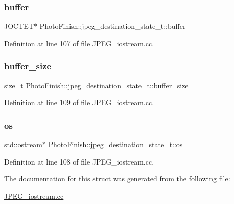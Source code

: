 \subsubsection{\texorpdfstring{buffer}{buffer}}
{\footnotesize\ttfamily J\+O\+C\+T\+ET$\ast$ Photo\+Finish\+::jpeg\+\_\+destination\+\_\+state\+\_\+t\+::buffer}



Definition at line 107 of file J\+P\+E\+G\+\_\+iostream.\+cc.

\mbox{\label{struct_photo_finish_1_1jpeg__destination__state__t_a5882d9ced931f07986e3cdb875943d94}} 
\subsubsection{\texorpdfstring{buffer\+\_\+size}{buffer\_size}}
{\footnotesize\ttfamily size\+\_\+t Photo\+Finish\+::jpeg\+\_\+destination\+\_\+state\+\_\+t\+::buffer\+\_\+size}



Definition at line 109 of file J\+P\+E\+G\+\_\+iostream.\+cc.

\mbox{\label{struct_photo_finish_1_1jpeg__destination__state__t_ae2bbb549f2d08fcd3f78c53e8f95646a}} 
\subsubsection{\texorpdfstring{os}{os}}
{\footnotesize\ttfamily std\+::ostream$\ast$ Photo\+Finish\+::jpeg\+\_\+destination\+\_\+state\+\_\+t\+::os}



Definition at line 108 of file J\+P\+E\+G\+\_\+iostream.\+cc.



The documentation for this struct was generated from the following file\+:\begin{DoxyCompactItemize}
\item 
\hyperlink{_j_p_e_g__iostream_8cc}{J\+P\+E\+G\+\_\+iostream.\+cc}\end{DoxyCompactItemize}
